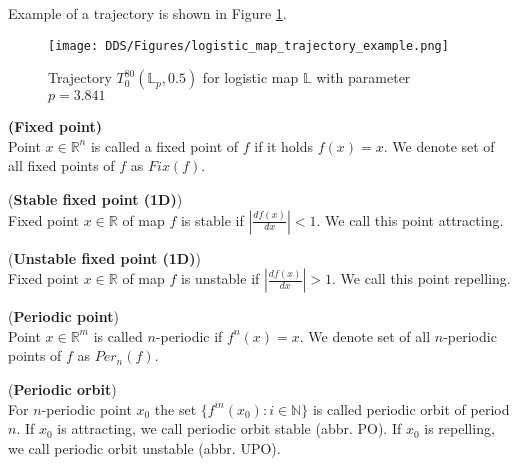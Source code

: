 \begin{remark}
    Example of a trajectory is shown in Figure \ref{fig:trajectory_example}.
\end{remark}

\begin{figure}[!h]
    \centering
    \texttt{[image: DDS/Figures/logistic\_map\_trajectory\_example.png]}
    \caption{Trajectory $T_{0}^{80}(\mathbb{L}_p, 0.5)$ for logistic map $\mathbb{L}$ with parameter $p=3.841$}
    \label{fig:trajectory_example}
\end{figure}

\begin{definition} \textbf{(Fixed point)} \\
    \label{def:fixed point}
    Point $x \in \mathbb{R}^n$ is called a fixed point of $f$ if it holds $f(x) = x$.
    We denote set of all fixed points of $f$ as $Fix(f)$. \cite{Devaney20211026}
\end{definition}

\begin{definition} (\textbf{Stable fixed point (1D)})\\
    Fixed point $x \in \mathbb{R}$ of map $f$ is stable if $|\frac{d{f(x)}}{dx}| < 1$.
    We call this point attracting.
\end{definition}

\begin{definition} (\textbf{Unstable fixed point (1D)})\\
    Fixed point $x \in \mathbb{R}$ of map $f$ is unstable if $|\frac{d{f(x)}}{dx}| > 1$.
    We call this point repelling.
\end{definition}

\begin{definition} (\textbf{Periodic point})\\
    Point $x \in \mathbb{R}^m$ is called $n$-periodic if $f^{n}(x)=x$.
    We denote set of all $n$-periodic points of $f$ as $Per_{n}(f)$. \cite{Devaney20211026}
\end{definition}

\begin{definition} (\textbf{Periodic orbit})\\
    For $n$-periodic point $x_0$ the set $\{f^{in}(x_0):i \in \mathbb{N}\}$ is called periodic orbit of period $n$.
    If $x_0$ is attracting, we call periodic orbit stable (abbr. PO).
    If $x_0$ is repelling, we call periodic orbit unstable (abbr. UPO).
\end{definition}

